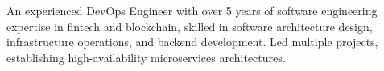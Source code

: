 

\begin{cvparagraph}

An experienced DevOps Engineer with over 5 years of software engineering expertise in fintech and blockchain, skilled in software architecture design, infrastructure operations, and backend development. Led multiple projects, establishing high-availability microservices architectures.
\end{cvparagraph}

